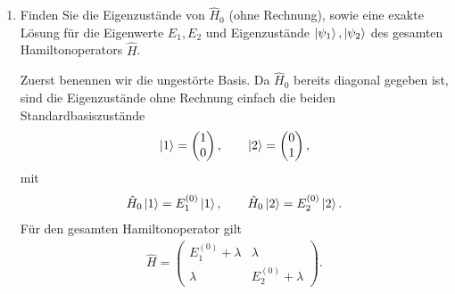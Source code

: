 \documentclass[11pt,a4paper]{scrartcl}
\newcommand{\op}[1]{\hat{#1}}
\begin{document}
    \begin{enumerate}[label=(\alph*)]
        \item Finden Sie die Eigenzustände von $\op H_0$ (ohne Rechnung), sowie eine exakte Lösung für die Eigenwerte $E_1,E_2$ und Eigenzustände $\ket{\psi_1},\ket{\psi_2}$ des gesamten Hamiltonoperators $\op H$.

        \begin{calculationbox}
            \begin{solutionbox}
                Zuerst benennen wir die ungestörte Basis. Da $\op H_0$ bereits diagonal gegeben ist, sind die Eigenzustände ohne Rechnung einfach die beiden Standardbasiszustände
                \begin{align*}
                    \ket{1}
                    =
                    \begin{pmatrix}1\\0\end{pmatrix},
                    \qquad
                    \ket{2}
                    =
                    \begin{pmatrix}0\\1\end{pmatrix},
                \end{align*}
                mit
                \begin{align*}
                    \op H_0\ket{1}=E_1^{(0)}\ket{1},
                    \qquad
                    \op H_0\ket{2}=E_2^{(0)}\ket{2}.
                \end{align*}
                Für den gesamten Hamiltonoperator gilt
                \begin{align*}
                    \op H
                    =
                    \begin{pmatrix}
                        E_1^{(0)} + \lambda & \lambda\\
                        \lambda & E_2^{(0)} + \lambda
                    \end{pmatrix}.
                \end{align*}
            \end{solutionbox}


\end{calculationbox}
\end{enumerate}
\end{document}

